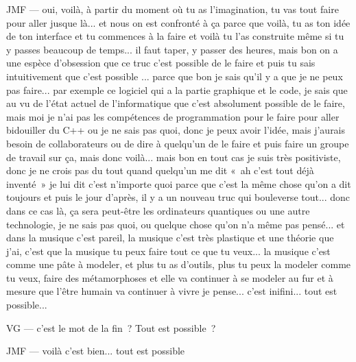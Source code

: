 JMF — oui, voilà, à partir du moment où tu as l'imagination, tu vas tout faire pour aller jusque là... et nous on est confronté à ça parce que voilà, tu as ton idée de ton interface et tu commences à la faire et voilà tu l'as construite même si tu y passes beaucoup de temps... il faut taper, y passer des heures, mais bon on a une espèce d'obsession que ce truc c'est possible de le faire et puis tu sais intuitivement que c'est possible ... parce que bon je sais qu'il y a que je ne peux pas faire... par exemple ce logiciel qui a la partie graphique et le code, je sais que au vu de l'état actuel de l'informatique que c'est absolument possible de le faire, mais moi je n'ai pas les compétences de programmation pour le faire pour aller bidouiller du C++ ou je ne sais pas quoi, donc je peux avoir l'idée, mais j'aurais besoin de collaborateurs ou de dire à quelqu'un de le faire et puis faire un groupe de travail sur ça, mais donc voilà... mais bon en tout cas je suis très positiviste, donc je ne crois pas du tout quand quelqu'un me dit « ah c'est tout déjà inventé » je lui dit c'est n'importe quoi parce que c'est la même chose qu'on a dit toujours et puis le jour d'après, il y a un nouveau truc qui bouleverse tout... donc dans ce cas là, ça sera peut-être les ordinateurs quantiques ou une autre technologie, je ne sais pas quoi, ou quelque chose qu'on n'a même pas pensé... et dans la musique c'est pareil, la musique c'est très plastique et une théorie que j'ai, c'est que la musique tu peux faire tout ce que tu veux... la musique c'est comme une pâte à modeler, et plus tu as d'outils, plus tu peux la modeler comme tu veux, faire des métamorphoses et elle va continuer à se modeler au fur et à mesure que l'être humain va continuer à vivre je pense... c'est inifini... tout est possible...  

VG — c'est le mot de la fin ? Tout est possible ? 

JMF — voilà c'est bien... tout est possible 
